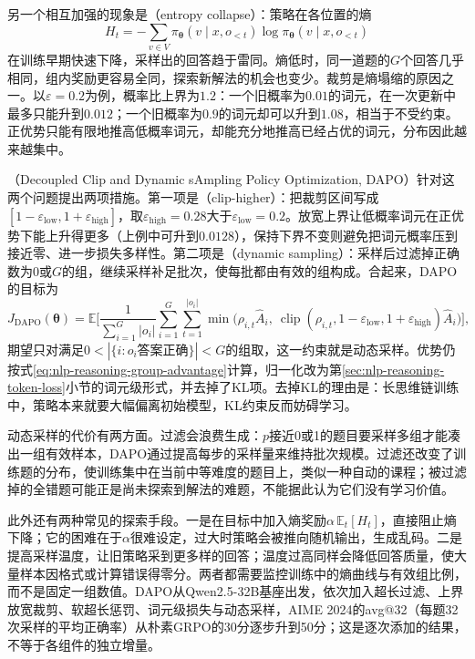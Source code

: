 另一个相互加强的现象是（entropy collapse）：策略在各位置的熵
\[
  H_t=-\sum_{v\in V}\pi_{\bm\theta}(v\mid x,o_{<t})\log\pi_{\bm\theta}(v\mid x,o_{<t})
\]
在训练早期快速下降，采样出的回答趋于雷同。熵低时，同一道题的$G$个回答几乎相同，组内奖励更容易全同，探索新解法的机会也变少。裁剪是熵塌缩的原因之一。以$\varepsilon=0.2$为例，概率比上界为$1.2$：一个旧概率为$0.01$的词元，在一次更新中最多只能升到$0.012$；一个旧概率为$0.9$的词元却可以升到$1.08$，相当于不受约束。正优势只能有限地推高低概率词元，却能充分地推高已经占优的词元，分布因此越来越集中。

（Decoupled Clip and Dynamic sAmpling Policy Optimization, DAPO）针对这两个问题提出两项措施。第一项是（clip-higher）：把裁剪区间写成$[1-\varepsilon_{\mathrm{low}},1+\varepsilon_{\mathrm{high}}]$，取$\varepsilon_{\mathrm{high}}=0.28$大于$\varepsilon_{\mathrm{low}}=0.2$。放宽上界让低概率词元在正优势下能上升得更多（上例中可升到$0.0128$），保持下界不变则避免把词元概率压到接近零、进一步损失多样性。第二项是（dynamic sampling）：采样后过滤掉正确数为0或$G$的组，继续采样补足批次，使每批都由有效的组构成。合起来，DAPO的目标为
\begin{equation}
  J_{\mathrm{DAPO}}(\bm\theta)=\mathbb E\Biggl[\frac{1}{\sum_{i=1}^{G}|o_i|}\sum_{i=1}^{G}\sum_{t=1}^{|o_i|}
  \min\bigl(\rho_{i,t}\widehat A_{i},\ \operatorname{clip}(\rho_{i,t},1-\varepsilon_{\mathrm{low}},1+\varepsilon_{\mathrm{high}})\widehat A_{i}\bigr)\Biggr],
  \label{eq:nlp-reasoning-dapo}
\end{equation}
期望只对满足$0<|\{i:o_i\text{答案正确}\}|<G$的组取，这一约束就是动态采样。优势仍按式\eqref{eq:nlp-reasoning-group-advantage}计算，归一化改为第\ref{sec:nlp-reasoning-token-loss}小节的词元级形式，并去掉了KL项。去掉KL的理由是：长思维链训练中，策略本来就要大幅偏离初始模型，KL约束反而妨碍学习。

动态采样的代价有两方面。过滤会浪费生成：$p$接近0或1的题目要采样多组才能凑出一组有效样本，DAPO通过提高每步的采样量来维持批次规模。过滤还改变了训练题的分布，使训练集中在当前中等难度的题目上，类似一种自动的课程；被过滤掉的全错题可能正是尚未探索到解法的难题，不能据此认为它们没有学习价值。

此外还有两种常见的探索手段。一是在目标中加入熵奖励$\alpha\,\mathbb E_t[H_t]$，直接阻止熵下降；它的困难在于$\alpha$很难设定，过大时策略会被推向随机输出，生成乱码。二是提高采样温度，让旧策略采到更多样的回答；温度过高同样会降低回答质量，使大量样本因格式或计算错误得零分。两者都需要监控训练中的熵曲线与有效组比例，而不是固定一组数值。DAPO从Qwen2.5-32B基座出发，依次加入超长过滤、上界放宽裁剪、软超长惩罚、词元级损失与动态采样，AIME 2024的avg@32（每题32次采样的平均正确率）从朴素GRPO的30分逐步升到50分；这是逐次添加的结果，不等于各组件的独立增量。

